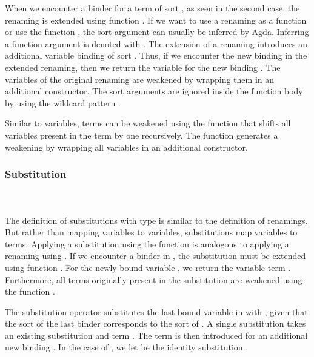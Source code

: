 \noindent When we encounter a binder for a term of sort , as seen in the second case, the renaming is extended using function . 
If we want to use a renaming as a function or use the function , the sort argument  can usually be inferred by Agda. 
Inferring a function argument is denoted with \Sym{\_}. 
\Frenext
The extension of a renaming introduces an additional variable binding of sort . Thus, if we encounter the new binding  in the extended renaming, then we return the variable for the new binding . 
The variables  of the original renaming  are weakened by wrapping them in an additional  constructor. The sort arguments are ignored inside the function body by using the wildcard pattern \Sym{\_}.

\noindent Similar to variables, terms can be weakened using the function  that shifts all variables present in the term by one recursively. 
\Fwk 
The function  generates a weakening by wrapping all variables in an additional  constructor.
\Frenwk

\subsubsection{Substitution}\hfill\\\\
The definition of substitutions  with type    is similar to the definition of renamings. 
But rather than mapping variables to variables, substitutions map variables to terms.
\FSub
Applying a substitution using the  function is analogous to applying a renaming using . 
If we encounter a binder in , the substitution must be extended using function .
\Fext
For the newly bound variable , we return the variable term .  
Furthermore, all terms  originally present in the substitution  are weakened using the function .

\noindent The substitution operator  \Data{[}  \Data{]} substitutes the last bound variable in  with , given that the sort of the last binder corresponds to the sort of .
\Fsubs
A single substitution  takes an existing substitution  and term . The term  is then introduced for an additional new binding . 
\Fsinglesub
In the case of \Data{\_[\_]}, we let  be the identity substitution \Fidsub.

